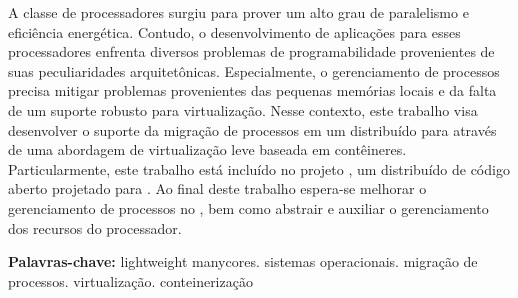 \begin{resumo}[Resumo]
  A classe de processadores \lw surgiu para prover um alto grau de paralelismo e eficiência energética. Contudo, o desenvolvimento de aplicações para esses processadores enfrenta diversos problemas de programabilidade provenientes de suas peculiaridades arquitetônicas. Especialmente, o gerenciamento de processos precisa mitigar problemas provenientes das pequenas memórias locais e da falta de um suporte robusto para virtualização. Nesse contexto, este trabalho visa desenvolver o suporte da migração de processos em um \os distribuído para \lws através de uma abordagem de virtualização leve baseada em contêineres. Particularmente, este trabalho está incluído no projeto \nanvix, um \os distribuído de código aberto projetado para \lws. Ao final deste trabalho espera-se melhorar o gerenciamento de processos no \nanvix, bem como abstrair e auxiliar o gerenciamento dos recursos do processador.

  \vspace{\baselineskip} 
  \textbf{Palavras-chave:} lightweight manycores. sistemas operacionais. migração de processos. virtualização. conteinerização
\end{resumo}
